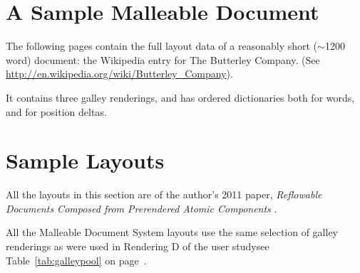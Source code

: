 
%


\cleardoublepage
\chapter{A Sample Malleable Document}
\label{app:sampledoc}

The following pages contain the full layout data of a reasonably short ($\sim$1200 word) document: the Wikipedia entry for The Butterley Company. (See \url{http://en.wikipedia.org/wiki/Butterley_Company}).

It contains three galley renderings, and has ordered dictionaries both for words, and for position deltas.

\newpage




\cleardoublepage
\chapter{Sample Layouts}
\label{app:layouts}

All the layouts in this section are of the author's 2011 paper, \emph{Reflowable Documents Composed from Prerendered Atomic Components} \cite{Pinkney2011}.

All the Malleable Document System layouts use the same selection of galley renderings as were used in Rendering D of the user study\ed see Table~\ref{tab:galleypool} on page~\pageref{tab:galleypool}.


